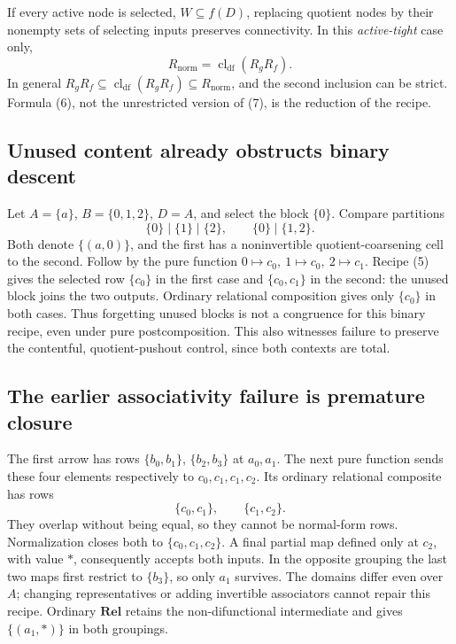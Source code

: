 \documentclass[11pt,a4paper]{article}
\newcommand{\Rel}{\mathbf{Rel}}
\newcommand{\cldf}{\operatorname{cl}_{\mathrm{df}}}
\begin{document}
If every active node is selected, \(W\subseteq f(D)\), replacing quotient
nodes by their nonempty sets of selecting inputs preserves connectivity. In this
\emph{active-tight} case only,
\[
 R_{\mathrm{norm}}=\cldf(R_gR_f).
 \tag{7}
\]
In general \(R_gR_f\subseteq\cldf(R_gR_f)\subseteq R_{\mathrm{norm}}\),
and the second inclusion can be strict. Formula (6), not the unrestricted
version of (7), is the reduction of the recipe.

\subsection{Unused content already obstructs binary descent}

Let \(A=\{a\}\), \(B=\{0,1,2\}\), \(D=A\), and select the block \(\{0\}\).
Compare partitions
\[
 \{0\}\mid\{1\}\mid\{2\},\qquad \{0\}\mid\{1,2\}.
\]
Both denote \(\{(a,0)\}\), and the first has a noninvertible quotient-coarsening
cell to the second. Follow by the pure function
\(0\mapsto c_0,\ 1\mapsto c_0,\ 2\mapsto c_1\).
Recipe (5) gives the selected row \(\{c_0\}\) in the first case and
\(\{c_0,c_1\}\) in the second: the unused block joins the two outputs.
Ordinary relational composition gives only \(\{c_0\}\) in both cases.
Thus forgetting unused blocks is not a congruence for this binary recipe,
even under pure postcomposition. This also witnesses failure to preserve the
contentful, quotient-pushout control, since both contexts are total.

\subsection{The earlier associativity failure is premature closure}

The first arrow has rows \(\{b_0,b_1\}\), \(\{b_2,b_3\}\) at
\(a_0,a_1\). The next pure function sends these four elements respectively to
\(c_0,c_1,c_1,c_2\). Its ordinary relational composite has rows
\[
 \{c_0,c_1\},\qquad \{c_1,c_2\}.
\]
They overlap without being equal, so they cannot be normal-form rows.
Normalization closes both to \(\{c_0,c_1,c_2\}\). A final partial map defined
only at \(c_2\), with value \(*\), consequently accepts both inputs. In the
opposite grouping the last two maps first restrict to \(\{b_3\}\), so only
\(a_1\) survives. The domains differ even over \(A\); changing representatives
or adding invertible associators cannot repair this recipe. Ordinary \(\Rel\)
retains the non-difunctional intermediate and gives \(\{(a_1,*)\}\) in both
groupings.
\end{document}
